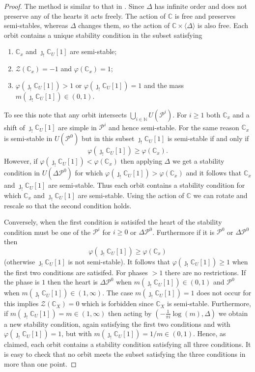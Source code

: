 \documentclass{article}
\theoremstyle{plain}
\theoremstyle{definition}
\theoremstyle{remark}
\newcommand{\N}{\mathbb{N}}
\newcommand{\C}{\mathbb{C}}
\newcommand{\cat}[1]{\mathcal{#1}}
\begin{document}
\begin{proof}
The method is similar to that in \cite[\S 4]{MR2219846}. Since  $\Delta$ has infinite order and does not preserve any of the hearts it acts freely. The action of $\C$ is free and preserves semi-stables, whereas $\Delta$ changes them, so the action of $\C\times \langle\Delta\rangle$ is also free. Each orbit  contains a unique stability condition in the subset satisfying
\begin{enumerate}
\item $\C_x$ and $\jmath_!\C_U[1]$ are semi-stable;
\item $\mathcal{Z}(\C_x) = -1$ and $\varphi(\C_x) = 1$;
\item $\varphi(\jmath_!\C_U[1]) > 1$ or $\varphi(\jmath_!\C_U[1])=1$ and the mass $m(\jmath_!\C_U[1]) \in (0,1)$. 
\end{enumerate}
To see this note that any orbit  intersects $\bigcup_{i\in \N} U(\cat{P}^i)$.
For $i\geq 1$ both $\C_x$ and a shift of $\jmath_!\C_U[1]$ are simple in $\cat{P}^i$ and hence semi-stable. For the same reason $\C_x$ is semi-stable in $U(\cat{P}^0)$ but in this subset $\jmath_!\C_U[1]$ is semi-stable if and only if $$\varphi(\jmath_!\C_U[1]) \geq \varphi(\C_x).$$ However, if $\varphi(\jmath_!\C_U[1]) < \varphi(\C_x)$ then applying $\Delta$ we get a stability condition in $U(\Delta\cat{P}^0)$ for which $\varphi(\jmath_!\C_U[1]) > \varphi(\C_x)$ and it follows that $\C_x$ and $\jmath_!\C_U[1]$ are semi-stable. Thus each orbit contains a stability condition for which $\C_x$ and $\jmath_!\C_U[1]$ are semi-stable. Using the action of $\C$ we can rotate and rescale so that the second condition holds. 

Conversely, when the first condition is satisifed the heart of the stability condition must be one of the $\cat{P}^i$ for $i\geq 0$ or $\Delta \cat{P}^0$. Furthermore if it is $\cat{P}^0$ or $\Delta \cat{P}^0$ then 
$$
\varphi(\jmath_!\C_U[1]) \geq \varphi(\C_x)
$$
(otherwise $\jmath_!\C_U[1]$ is not semi-stable). It follows that $\varphi(\jmath_!\C_U[1])\geq 1$ when the first two conditions are satisifed. For phases $>1$ there are no restrictions. If the phase is $1$ then the heart is $\Delta \cat{P}^0$ when $m(\jmath_!\C_U[1])\in (0,1)$ and $\cat{P}^0$ when $m(\jmath_!\C_U[1])\in (1,\infty)$. The case $m(\jmath_!\C_U[1]) = 1$ does not occur for this implies $\mathcal{Z}(\C_X)=0$ which is forbidden since $\C_X$ is semi-stable. Furthermore, if $m(\jmath_!\C_U[1])=m\in (1,\infty)$ then acting by $(-\frac{1}{\pi i} \log(m),\Delta)$ we obtain a new stability condition, again satisfying the first two conditions and with $\varphi(\jmath_!\C_U[1])= 1$, but with $m(\jmath_!\C_U[1])=1/m \in (0,1)$. Hence, as claimed, each orbit contains a stability condition satisfying all three conditions. It is easy to check that no orbit meets the subset satisfying the three conditions in more than one point.


\end{proof}
\end{document}
